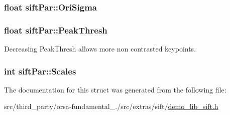 \subsubsection[{Ori\+Sigma}]{\setlength{\rightskip}{0pt plus 5cm}float sift\+Par\+::\+Ori\+Sigma}\label{structsiftPar_ab250ea64745ea3c2f43d2702c08b70e1}
\hypertarget{structsiftPar_ad1996ed38b7c422e7b57837f38c2a72d}{}
\subsubsection[{Peak\+Thresh}]{\setlength{\rightskip}{0pt plus 5cm}float sift\+Par\+::\+Peak\+Thresh}\label{structsiftPar_ad1996ed38b7c422e7b57837f38c2a72d}


Decreasing Peak\+Thresh allows more non contrasted keypoints. 

\hypertarget{structsiftPar_ae116396e6087d1ce9c9feeae64dd2c8d}{}
\subsubsection[{Scales}]{\setlength{\rightskip}{0pt plus 5cm}int sift\+Par\+::\+Scales}\label{structsiftPar_ae116396e6087d1ce9c9feeae64dd2c8d}


The documentation for this struct was generated from the following file\+:\begin{DoxyCompactItemize}
\item 
src/third\+\_\+party/orsa-\/fundamental\+\_./src/extras/sift/\hyperlink{demo__lib__sift_8h}{demo\+\_\+lib\+\_\+sift.\+h}\end{DoxyCompactItemize}
